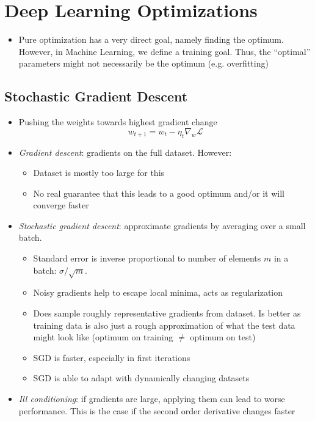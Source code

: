\section{Deep Learning Optimizations}
\begin{itemize}
	\item Pure optimization has a very direct goal, namely finding the optimum. However, in Machine Learning, we define a training goal. Thus, the ``optimal'' parameters might not necessarily be the optimum (e.g. overfitting)
\end{itemize}
\subsection{Stochastic Gradient Descent}
\begin{itemize}
	\item Pushing the weights towards highest gradient change
	$$w_{t+1} = w_{t} - \eta_t \nabla_{w} \mathcal{L}$$
	\item \textit{Gradient descent}: gradients on the full dataset. However:
	\begin{itemize}
		\item Dataset is mostly too large for this
		\item No real guarantee that this leads to a good optimum and/or it will converge faster
	\end{itemize}
	\item \textit{Stochastic gradient descent}: approximate gradients by averaging over a small batch. 
	\begin{itemize}
		\item Standard error is inverse proportional to number of elements $m$ in a batch: $\sigma / \sqrt{m}$.
		\item Noisy gradients help to escape local minima, acts as regularization
		\item Does sample roughly representative gradients from dataset. Is better as training data is also just a rough approximation of what the test data might look like (optimum on training $\neq$ optimum on test)
		\item SGD is faster, especially in first iterations
		\item SGD is able to adapt with dynamically changing datasets
	\end{itemize}
	\item \textit{Ill conditioning}: if gradients are large, applying them can lead to worse performance. This is the case if the second order derivative changes faster 
\end{itemize}
